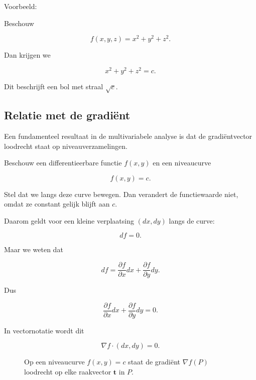 \documentclass[11pt,a4paper]{article}
\begin{document}
    Voorbeeld:

    Beschouw

    \[
        f(x,y,z) = x^2 + y^2 + z^2.
    \]

    Dan krijgen we

    \[
        x^2 + y^2 + z^2 = c.
    \]

    Dit beschrijft een bol met straal $\sqrt{c}$.

    \subsection{Relatie met de gradiënt}

    Een fundamenteel resultaat in de multivariabele analyse is dat
    de gradiëntvector loodrecht staat op niveauverzamelingen.

    Beschouw een differentieerbare functie $f(x,y)$ en een niveaucurve

    \[
        f(x,y) = c.
    \]

    Stel dat we langs deze curve bewegen. Dan verandert de functiewaarde
    niet, omdat ze constant gelijk blijft aan $c$.

    Daarom geldt voor een kleine verplaatsing $(dx,dy)$ langs de curve:

    \[
        df = 0.
    \]

    Maar we weten dat

    \[
        df = \frac{\partial f}{\partial x}dx + \frac{\partial f}{\partial y}dy.
    \]

    Dus

    \[
        \frac{\partial f}{\partial x}dx + \frac{\partial f}{\partial y}dy = 0.
    \]

    In vectornotatie wordt dit

    \[
        \nabla f \cdot (dx,dy) = 0.
    \]

    \begin{figure}[htbp]
        \centering
        \caption{Op een niveaucurve $f(x,y)=c$ staat de gradi\"ent $\nabla f(P)$ loodrecht op elke raakvector $\mathbf{t}$ in $P$.}
        \label{fig:gradient-loodrecht-niveaucurve}
    \end{figure}
\end{document}
